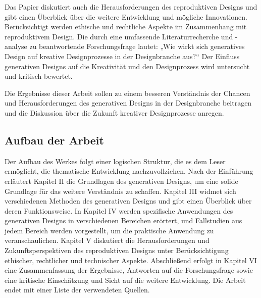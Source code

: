  Das Papier diskutiert auch die Herausforderungen des reproduktiven Designs und gibt einen Überblick über die weitere Entwicklung und mögliche Innovationen. Berücksichtigt werden ethische und rechtliche Aspekte im Zusammenhang mit reproduktivem Design. Die durch eine umfassende Literaturrecherche und -analyse zu beantwortende Forschungsfrage lautet: „Wie wirkt sich generatives Design auf kreative Designprozesse in der Designbranche aus?“ Der Einfluss generativen Designs auf die Kreativität und den Designprozess wird untersucht und kritisch bewertet. 
 
 Die Ergebnisse dieser Arbeit sollen zu einem besseren Verständnis der Chancen und Herausforderungen des generativen Designs in der Designbranche beitragen und die Diskussion über die Zukunft kreativer Designprozesse anregen.

 \subsection*{Aufbau der Arbeit}
 Der Aufbau des Werkes folgt einer logischen Struktur, die es dem Leser ermöglicht, die thematische Entwicklung  nachzuvollziehen. Nach der Einführung erläutert Kapitel II die Grundlagen des generativen Designs, um eine solide Grundlage für das weitere Verständnis zu schaffen. Kapitel III widmet sich  verschiedenen Methoden des generativen Designs und gibt einen Überblick über deren Funktionsweise. 
 In Kapitel IV werden spezifische Anwendungen des generativen Designs in verschiedenen Bereichen erörtert, und Fallstudien aus jedem Bereich werden vorgestellt, um die praktische Anwendung zu veranschaulichen.  Kapitel V diskutiert die Herausforderungen und Zukunftsperspektiven des reproduktiven Designs unter Berücksichtigung ethischer, rechtlicher und technischer Aspekte. Abschließend erfolgt in Kapitel VI eine Zusammenfassung der Ergebnisse, Antworten auf die  Forschungsfrage sowie eine kritische Einschätzung und Sicht auf die weitere Entwicklung. Die Arbeit endet mit einer Liste der verwendeten Quellen.



